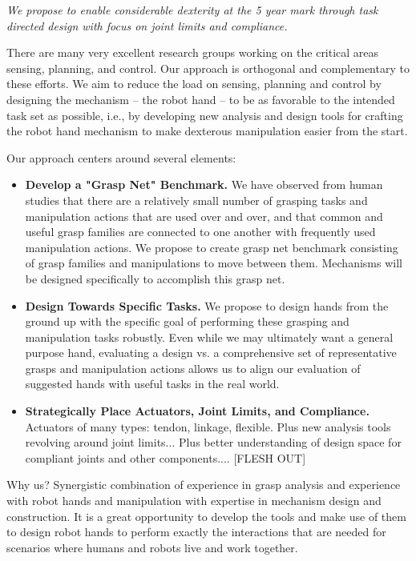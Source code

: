 {\it We propose to enable considerable dexterity at the 5 year mark through task directed design with focus on joint limits and compliance.}

There are many very excellent research groups working on the critical areas sensing, planning, and control.   Our approach is orthogonal and complementary to these efforts.    We aim to reduce the load on sensing, planning and control by designing the mechanism -- the robot hand -- to be as favorable to the intended task set as possible, i.e., by developing new analysis and design tools for crafting the robot hand mechanism to make dexterous manipulation easier from the start.

Our approach centers around several elements:
\begin{itemize}
  \item {\bf Develop a "Grasp Net" Benchmark.}   We have observed from human studies that there are a relatively small number of grasping tasks and manipulation actions that are used over and over, and that common and useful grasp families are connected to one another with frequently used manipulation actions.   We propose to create grasp net benchmark consisting of grasp families and manipulations to move between them.   Mechanisms will be designed specifically to accomplish this grasp net.
	
\item {\bf Design Towards Specific Tasks.}   We propose to design hands from the ground up with the specific goal of performing these grasping and manipulation tasks robustly.    Even while we may ultimately want a general purpose hand, evaluating a design vs. a comprehensive set of representative grasps and manipulation actions allows us to align our evaluation of suggested hands with useful tasks in the real world.

\item {\bf Strategically Place Actuators, Joint Limits, and Compliance.}  Actuators of many types:  tendon, linkage, flexible.   Plus new analysis tools revolving around joint limits...   Plus better understanding of design space for compliant joints and other components.... [FLESH OUT]

\end{itemize}	
	
Why us?   Synergistic combination of experience in grasp analysis and experience with robot hands and manipulation with expertise in mechanism design and construction.   It is a great opportunity to develop the tools and make use of them to design robot hands to perform exactly the interactions that are needed for scenarios where humans and robots live and work together.

